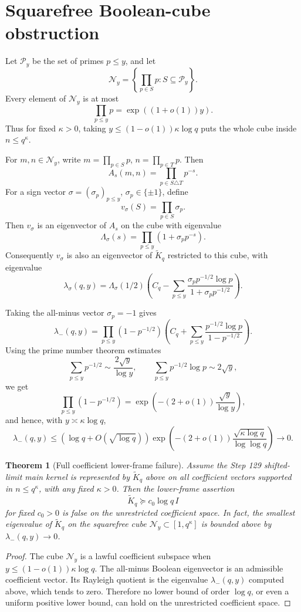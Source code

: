 \documentclass[11pt]{article}
\newtheorem{theorem}{Theorem}
\begin{document}
\section{Squarefree Boolean-cube obstruction}
Let $\mathcal P_y$ be the set of primes $p\le y$, and let
\[
  \mathcal N_y=\left\{\prod_{p\in S}p:S\subseteq \mathcal P_y\right\}.
\]
Every element of $\mathcal N_y$ is at most
\[
  \prod_{p\le y}p=\exp((1+o(1))y).
\]
Thus for fixed $\kappa>0$, taking $y\le(1-o(1))\kappa\log q$ puts the whole cube inside $n\le q^\kappa$.

For $m,n\in\mathcal N_y$, write $m=\prod_{p\in S}p$, $n=\prod_{p\in T}p$.  Then
\[
  A_s(m,n)=\prod_{p\in S\triangle T}p^{-s}.
\]
For a sign vector $\sigma=(\sigma_p)_{p\le y}$, $\sigma_p\in\{\pm1\}$, define
\[
  v_\sigma(S)=\prod_{p\in S}\sigma_p.
\]
Then $v_\sigma$ is an eigenvector of $A_s$ on the cube with eigenvalue
\[
  \Lambda_\sigma(s)=\prod_{p\le y}(1+\sigma_p p^{-s}).
\]
Consequently $v_\sigma$ is also an eigenvector of $\widetilde K_q$ restricted to this cube, with eigenvalue
\[
  \boxed{
  \lambda_\sigma(q,y)=
  \Lambda_\sigma(1/2)
  \left(
    C_q-
    \sum_{p\le y}\frac{\sigma_p p^{-1/2}\log p}{1+\sigma_p p^{-1/2}}
  \right).
  }
\]

Taking the all-minus vector $\sigma_p=-1$ gives
\[
  \lambda_-(q,y)=
  \prod_{p\le y}(1-p^{-1/2})
  \left(
    C_q+
    \sum_{p\le y}\frac{p^{-1/2}\log p}{1-p^{-1/2}}
  \right).
\]
Using the prime number theorem estimates
\[
  \sum_{p\le y}p^{-1/2}\sim \frac{2\sqrt y}{\log y},
  \qquad
  \sum_{p\le y}p^{-1/2}\log p\sim 2\sqrt y,
\]
we get
\[
  \prod_{p\le y}(1-p^{-1/2})
  =\exp\left(-(2+o(1))\frac{\sqrt y}{\log y}\right),
\]
and hence, with $y\asymp \kappa\log q$,
\[
  \boxed{
  \lambda_-(q,y)
  \le
  (\log q+O(\sqrt{\log q}))
  \exp\left(-(2+o(1))\frac{\sqrt{\kappa\log q}}{\log\log q}\right)
  \to0.
  }
\]

\begin{theorem}[Full coefficient lower-frame failure]
Assume the Step 129 shifted-limit main kernel is represented by $\widetilde K_q$ above on all coefficient vectors supported in $n\le q^\kappa$, with any fixed $\kappa>0$.  Then the lower-frame assertion
\[
  \widetilde K_q\succeq c_0\log q\,I
\]
for fixed $c_0>0$ is false on the unrestricted coefficient space.  In fact, the smallest eigenvalue of $\widetilde K_q$ on the squarefree cube $\mathcal N_y\subset[1,q^\kappa]$ is bounded above by $\lambda_-(q,y)\to0$.
\end{theorem}

\begin{proof}
The cube $\mathcal N_y$ is a lawful coefficient subspace when $y\le(1-o(1))\kappa\log q$.  The all-minus Boolean eigenvector is an admissible coefficient vector.  Its Rayleigh quotient is the eigenvalue $\lambda_-(q,y)$ computed above, which tends to zero.  Therefore no lower bound of order $\log q$, or even a uniform positive lower bound, can hold on the unrestricted coefficient space.
\end{proof}
\end{document}
